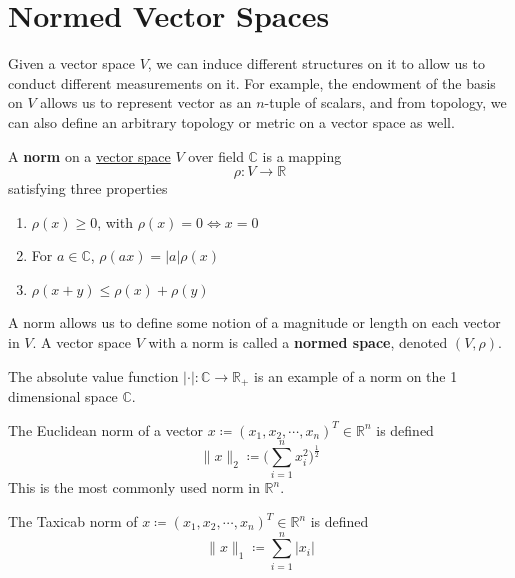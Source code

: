 \section{Normed Vector Spaces}

  Given a vector space $V$, we can induce different structures on it to allow us to conduct different measurements on it. For example, the endowment of the basis on $V$ allows us to represent vector as an $n$-tuple of scalars, and from topology, we can also define an arbitrary topology or metric on a vector space as well. 

  \begin{definition}[Norm]
    \label{def:norm}
    A \textbf{norm} on a \hyperref[def:vector-space]{vector space} $V$ over field $\mathbb{C}$ is a mapping 
    \begin{equation}
      \rho: V \to \mathbb{R}
    \end{equation}
    satisfying three properties 
    \begin{enumerate}
      \item $\rho (x) \geq 0$, with $\rho(x) = 0 \iff x = 0$
      \item For $a \in \mathbb{C}$, $\rho (a x) = |a| \rho(x)$ 
      \item $\rho(x + y) \leq \rho(x) + \rho(y)$ 
    \end{enumerate}
    A norm allows us to define some notion of a magnitude or length on each vector in $V$. A vector space $V$ with a norm is called a \textbf{normed space}, denoted $(V, \rho)$. 
  \end{definition}

  \begin{example}
    \label{ex:absolute-value}
    The absolute value function $|\cdot|: \mathbb{C} \to \mathbb{R}_+$ is an example of a norm on the 1 dimensional space $\mathbb{C}$. 
  \end{example}

  \begin{example}
    \label{ex:euclidean-norm-l2-norm}
    The Euclidean norm of a vector $x \coloneqq (x_1, x_2, \cdots, x_n)^T \in \mathbb{R}^n$ is defined
    \begin{equation}
      \|x\|_2 \coloneqq \bigg( \sum_{i=1}^n x_i^2 \bigg)^{\frac{1}{2}}
    \end{equation}
    This is the most commonly used norm in $\mathbb{R}^n$. 
  \end{example}

  \begin{example}
    \label{ex:taxicab-norm-manhattan-norm}
    The Taxicab norm of $x \coloneqq (x_1, x_2, \cdots, x_n)^T \in \mathbb{R}^n$ is defined
    \begin{equation}
      \|x\|_1 \coloneqq \sum_{i=1}^n |x_i|
    \end{equation}
  \end{example}

